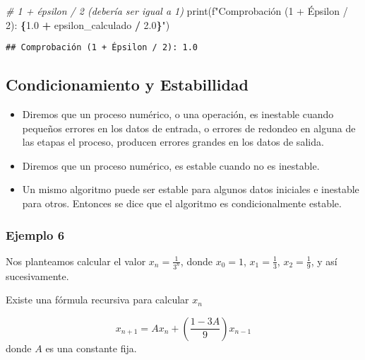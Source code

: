 \documentclass[
]{article}
\newenvironment{Shaded}{\begin{snugshade}}{\end{snugshade}}
\newcommand{\BuiltInTok}[1]{#1}
\newcommand{\CommentTok}[1]{\textcolor[rgb]{0.56,0.35,0.01}{\textit{#1}}}
\newcommand{\FloatTok}[1]{\textcolor[rgb]{0.00,0.00,0.81}{#1}}
\newcommand{\NormalTok}[1]{#1}
\newcommand{\OperatorTok}[1]{\textcolor[rgb]{0.81,0.36,0.00}{\textbf{#1}}}
\newcommand{\SpecialCharTok}[1]{\textcolor[rgb]{0.81,0.36,0.00}{\textbf{#1}}}
\newcommand{\SpecialStringTok}[1]{\textcolor[rgb]{0.31,0.60,0.02}{#1}}
\providecommand{\tightlist}{%
  \setlength{\itemsep}{0pt}\setlength{\parskip}{0pt}}
\begin{document}
\begin{Shaded}
\begin{Highlighting}[]
\CommentTok{\# 1 + épsilon / 2 (debería ser igual a 1)}
\BuiltInTok{print}\NormalTok{(}\SpecialStringTok{f"Comprobación (1 + Épsilon / 2): }\SpecialCharTok{\{}\FloatTok{1.0} \OperatorTok{+}\NormalTok{ epsilon\_calculado }\OperatorTok{/} \FloatTok{2.0}\SpecialCharTok{\}}\SpecialStringTok{"}\NormalTok{)}
\end{Highlighting}
\end{Shaded}

\begin{verbatim}
## Comprobación (1 + Épsilon / 2): 1.0
\end{verbatim}

\subsection{Condicionamiento y
Estabillidad}\label{condicionamiento-y-estabillidad}

\begin{itemize}
\tightlist
\item
  Diremos que un proceso numérico, o una operación, es inestable cuando
  pequeños errores en los datos de entrada, o errores de redondeo en
  alguna de las etapas el proceso, producen errores grandes en los datos
  de salida.
\item
  Diremos que un proceso numérico, es estable cuando no es inestable.
\item
  Un mismo algoritmo puede ser estable para algunos datos iniciales e
  inestable para otros. Entonces se dice que el algoritmo es
  condicionalmente estable.
\end{itemize}

\subsubsection{Ejemplo 6}\label{ejemplo-6}

Nos planteamos calcular el valor \(x_n=\frac{1}{3^n}\), donde \(x_0=1\),
\(x_1=\frac{1}{3}\), \(x_2=\frac{1}{9}\), y así sucesivamente.

Existe una fórmula recursiva para calcular \(x_n\)

\[
x_{n+1} = Ax_n + \left(\dfrac{1-3A}{9}\right)x_{n-1}
\] donde \(A\) es una constante fija.
\end{document}
